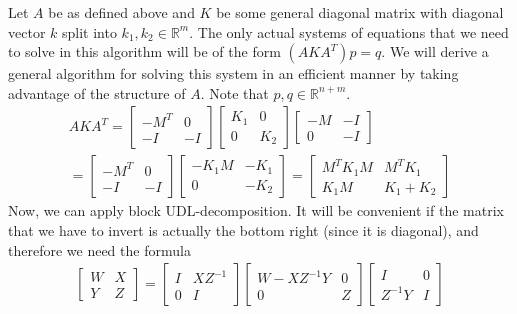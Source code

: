 \documentclass{article}
\newcommand{\R}{{\mathbb{R}}}
\begin{document}
Let $A$ be as defined above and $K$ be some general diagonal matrix with diagonal vector $k$ split into $k_1, k_2 \in \R^m$. The only actual systems of equations that we need to solve in this algorithm will be of the form $(AKA^T)p = q$. We will derive a general algorithm for solving this system in an efficient manner by taking advantage of the structure of $A$. Note that $p,q \in \R^{n+m}$.
\begin{align}
		AKA^T = 
		\begin{bmatrix}
				-M^T & 0\\
				-I & -I
		\end{bmatrix}
		\begin{bmatrix}
				K_1 & 0\\
				0 & K_2
		\end{bmatrix}
		\begin{bmatrix}
				-M & -I\\
				0 & -I
		\end{bmatrix}\\
		= 
		\begin{bmatrix}
				-M^T & 0\\
				-I & -I
		\end{bmatrix}
		\begin{bmatrix}
				-K_1M & -K_1\\
				0 & -K_2
		\end{bmatrix}
		= 
		\begin{bmatrix}
				M^TK_1M & M^TK_1\\
				K_1M & K_1 + K_2
		\end{bmatrix}
\end{align}
Now, we can apply block UDL-decomposition. It will be convenient if the matrix that we have to invert is actually the bottom right (since it is diagonal), and therefore we need the formula 
\begin{align}
		\begin{bmatrix}
				W & X\\
				Y & Z
		\end{bmatrix}
		=
		\begin{bmatrix}
				I & XZ^{-1}\\
				0 & I
		\end{bmatrix}
		\begin{bmatrix}
				W - XZ^{-1}Y & 0\\
				0 & Z
		\end{bmatrix}
		\begin{bmatrix}
				I & 0\\
				Z^{-1}Y & I
		\end{bmatrix}
\end{align}
\end{document}
